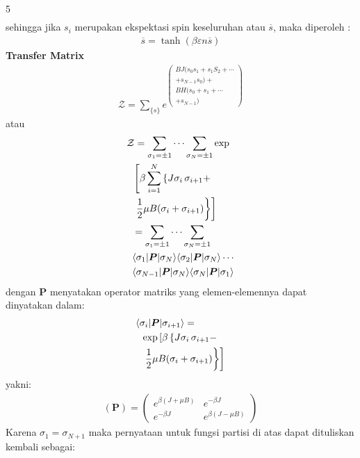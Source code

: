 \documentclass[a4paper  , 6 pt]{article}
\begin{document}
\begin{tiny}
\begin{multicols} {5}
\begin{align}
 \end{align}
 sehingga jika $s_i$ merupakan ekspektasi spin keseluruhan atau $\overline{s}$, maka diperoleh :
 \begin{align}
 \overline{s} = \tanh(\beta \varepsilon  n \overline{s})
 \end{align}
 \textbf{Transfer Matrix} \\
 \begin{align}
 \mathcal{Z} = \sum_{\{s\}} e^{\begin{pmatrix}
 BJ (s_0s_1 + s_1 S_2 + \cdots \\ + s_{N - 1}s_0) +\\ BH (s_0 + s_1 + \cdots \\+ s_{N -1})
 \end{pmatrix}} 
 \end{align}
 atau
\begin{align}
& \mathcal{Z}  = \sum_{\sigma_1 = \pm 1} \cdots \sum_{\sigma_N = \pm 1}
 \exp  \nonumber \\ 
 & \hspace{ 0.2 cm}  \left[
  \beta  \sum_{i = 1}^{N} 
  \left\{ 
  J \sigma_i \, \sigma_{i + 1} + \right. \right.  \nonumber \\ 
  & \hspace{ 0.2 cm} \left. \left.  \frac{1}{2} \mu B (\sigma_i + \sigma_{i +1})
  \right\} 
  \right]  \nonumber \\
  & \hspace{ 0.2 cm}  =   \sum_{\sigma_1 = \pm 1} \cdots \sum_{\sigma_N = \pm 1} \nonumber \\ 
  & \hspace{ 0.2 cm}  \langle \sigma_1 \lvert \boldsymbol{P} \lvert \sigma_N \rangle   \langle \sigma_2 \lvert \boldsymbol{P} \lvert \sigma_N \rangle \cdots \nonumber \\ 
  & \hspace{ 0.2 cm}   \langle \sigma_{N - 1} \lvert \boldsymbol{P} \lvert \sigma_{N} \rangle   \langle \sigma_N \lvert \boldsymbol{P} \lvert \sigma_1 \rangle
\end{align}
dengan $\boldsymbol{P}$ menyatakan operator matriks yang elemen-elemennya dapat dinyatakan dalam:
\begin{align}
 &  \langle \sigma_i \lvert \boldsymbol{P} \lvert \sigma_{i +1} \rangle = \nonumber \\ 
 & \hspace{ 0.2 cm}  \exp \left[ \beta \left\{ J \sigma_i \, \sigma_{i +1}  -  \right. \right. \nonumber \\ & \hspace{ 0.2 cm}  \left. \left. \frac{1}{2} \mu B ( \sigma_i + \sigma_{i + 1})\right\}\right]
\end{align}
yakni:
\begin{align}
(\boldsymbol{P}) = \left( 
\begin{array}{ll}
e^{\beta(J + \mu B)} & e^{- \beta J} \\
e^{- \beta J} & e^{\beta (J - \mu B)}
\end{array}
\right)
\end{align}
Karena $\sigma_1  = \sigma_{N +1}$ maka pernyataan untuk fungsi partisi di atas dapat dituliskan kembali sebagai:
\begin{align}

\end{align}
\end{multicols}
\end{tiny}
\end{document}
